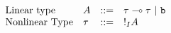 \documentclass[a4paper,11pt]{article}
\theoremstyle{definition}
\begin{document}



\[
\begin{array}{llll}
  \mbox{Linear type} & A &::=  &  \tau \multimap \tau ~|~ \mathtt{b} \\
  \mbox{Nonlinear Type} & \tau & ::= & !_{I} A   \\
\end{array}
\]
\end{document}
